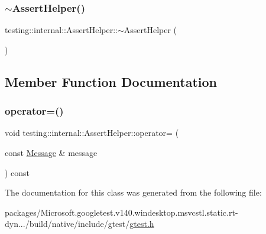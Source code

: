 \mbox{\label{classtesting_1_1internal_1_1_assert_helper_a51c640785d4ed4a0155cc9aa857d8931}} 
\subsubsection{\texorpdfstring{$\sim$AssertHelper()}{~AssertHelper()}}
{\footnotesize\ttfamily testing\+::internal\+::\+Assert\+Helper\+::$\sim$\+Assert\+Helper (\begin{DoxyParamCaption}{ }\end{DoxyParamCaption})}



\subsection{Member Function Documentation}
\mbox{\label{classtesting_1_1internal_1_1_assert_helper_a97bf22d786131ab7baa86b97a27aeb4d}} 
\subsubsection{\texorpdfstring{operator=()}{operator=()}}
{\footnotesize\ttfamily void testing\+::internal\+::\+Assert\+Helper\+::operator= (\begin{DoxyParamCaption}\item[{const \mbox{\hyperlink{classtesting_1_1_message}{Message}} \&}]{message }\end{DoxyParamCaption}) const}



The documentation for this class was generated from the following file\+:\begin{DoxyCompactItemize}
\item 
packages/\+Microsoft.\+googletest.\+v140.\+windesktop.\+msvcstl.\+static.\+rt-\/dyn.../build/native/include/gtest/\mbox{\hyperlink{gtest_8h}{gtest.\+h}}\end{DoxyCompactItemize}
